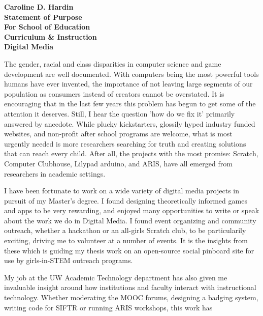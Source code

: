 \documentclass[12pt]{letter}
\begin{document}
\begin{letter}

\noindent 
\large\textbf{Caroline D. Hardin\\
Statement of Purpose\\
For School of Education\\
Curriculum \& Instruction\\
Digital Media
}
\vfill


\signature{Caroline D. Hardin} %


The gender, racial and class disparities in computer science and game development are well documented. With computers being the most powerful tools humans have ever invented, the importance of not leaving large segments of our population as consumers instead of creators cannot be overstated. It is encouraging that in the last few years this problem has begun to get some of the attention it deserves. Still, I hear the question 'how do we fix it' primarily answered by anecdote. While plucky kickstarters, glossily hyped industry funded websites, and non-profit after school programs are welcome, what is most urgently needed is more researchers searching for truth and creating solutions that can reach every child. After all, the projects with the most promise: Scratch, Computer Clubhouse, Lilypad arduino, and ARIS, have all emerged from researchers in academic settings.

I have been fortunate to work on a wide variety of digital media projects in pursuit of my Master's degree. I found designing theoretically informed games and apps to be very rewarding, and enjoyed many opportunities to write or speak about the work we do in Digital Media. I found event organizing and community outreach, whether a hackathon or an all-girls Scratch club, to be particularily exciting, driving me to volunteer at a number of events. It is the insights from these which is guiding my thesis work on an open-source social pinboard site for use by girls-in-STEM outreach programs.

My job at the UW Academic Technology department has also given me invaluable insight around how institutions and faculty interact with instructional technology. Whether moderating the MOOC forums, designing a badging system, writing code for SIFTR or running ARIS workshops, this work has 


\end{letter}
\end{document}
